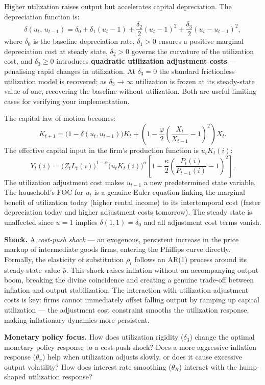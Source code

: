 \documentclass[11pt, a4paper]{article}
\begin{document}
Higher utilization raises output but accelerates capital depreciation. The
depreciation function is:
\[
    \delta(u_t,\,u_{t-1})
    = \delta_0
    + \delta_1(u_t-1)
    + \frac{\delta_2}{2}(u_t-1)^2
    + \frac{\delta_3}{2}(u_t-u_{t-1})^2,
\]
where $\delta_0$ is the baseline depreciation rate, $\delta_1 > 0$ ensures a
positive marginal depreciation cost at steady state, $\delta_2 > 0$ governs the
curvature of the utilization cost, and $\delta_3 \geq 0$ introduces
\textbf{quadratic utilization adjustment costs} --- penalising rapid changes in
utilization. At $\delta_3 = 0$ the standard frictionless utilization model is
recovered; as $\delta_3 \to \infty$ utilization is frozen at its steady-state
value of one, recovering the baseline without utilization. Both are useful
limiting cases for verifying your implementation.

The capital law of motion becomes:
\[
    K_{t+1} = \bigl(1-\delta(u_t,u_{t-1})\bigr)K_t
    + \left(1-\frac{\varphi}{2}\left(\frac{X_t}{X_{t-1}}-1\right)^2\right)X_t.
\]
The effective capital input in the firm's production function is $u_t K_t(i)$:
\[
    Y_t(i) = \bigl(Z_t L_t(i)\bigr)^{1-\alpha}
    \bigl(u_t K_t(i)\bigr)^\alpha
    \left[1-\frac{\kappa}{2}\left(\frac{P_t(i)}{P_{t-1}(i)}-1\right)^{\!2}\right].
\]
The utilization adjustment cost makes $u_{t-1}$ a new predetermined state
variable. The household's FOC for $u_t$ is a genuine Euler equation linking
the marginal benefit of utilization today (higher rental income) to its
intertemporal cost (faster depreciation today and higher adjustment costs
tomorrow). The steady state is unaffected since $u = 1$ implies
$\delta(1,1) = \delta_0$ and all adjustment cost terms vanish.

\textbf{Shock.} A \textit{cost-push shock} --- an exogenous, persistent
increase in the price markup of intermediate goods firms, entering the Phillips
curve directly. Formally, the elasticity of substitution $\rho_t$ follows an
AR(1) process around its steady-state value $\bar{\rho}$. This shock raises
inflation without an accompanying output boom, breaking the divine coincidence
and creating a genuine trade-off between inflation and output stabilization.
The interaction with utilization adjustment costs is key: firms cannot
immediately offset falling output by ramping up capital utilization --- the
adjustment cost constraint smooths the utilization response, making inflationary
dynamics more persistent.

\textbf{Monetary policy focus.} How does utilization rigidity ($\delta_3$)
change the optimal monetary policy response to a cost-push shock? Does a more
aggressive inflation response ($\theta_\pi$) help when utilization adjusts
slowly, or does it cause excessive output volatility? How does interest rate
smoothing ($\theta_R$) interact with the hump-shaped utilization response?
\end{document}
